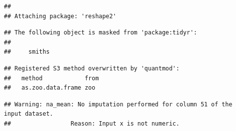 \documentclass[
]{article}
\begin{document}
\begin{verbatim}
## 
## Attaching package: 'reshape2'
\end{verbatim}

\begin{verbatim}
## The following object is masked from 'package:tidyr':
## 
##     smiths
\end{verbatim}

\begin{verbatim}
## Registered S3 method overwritten by 'quantmod':
##   method            from
##   as.zoo.data.frame zoo
\end{verbatim}

\begin{verbatim}
## Warning: na_mean: No imputation performed for column 51 of the input dataset.
##                 Reason: Input x is not numeric.
\end{verbatim}
\end{document}
